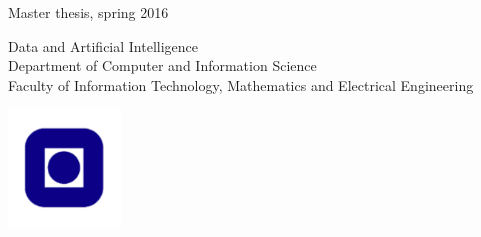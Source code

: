 \begin{titlepage}
\vspace{2cm}

\vspace{2cm}

\noindent Master thesis, spring 2016
\vspace{2cm}

\noindent Data and Artificial Intelligence \\Department of Computer and Information Science
\\Faculty of Information Technology, Mathematics and Electrical Engineering \\

\vfill
\begin{center}
\includegraphics[width=3cm]{fig/pre/ntnu.pdf}
\end{center}
\end{titlepage}

\thispagestyle{empty}

\afterpage{\blankpage}